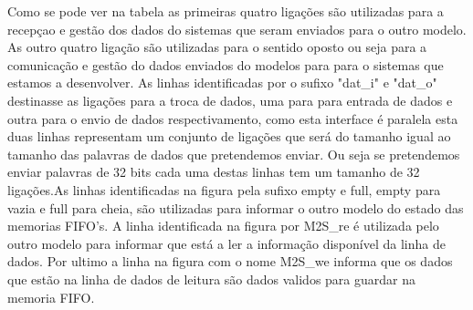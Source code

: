 Como se pode ver na tabela as primeiras quatro ligações são utilizadas para a recepçao e gestão dos dados do sistemas que seram enviados para o outro modelo. As outro quatro ligação são utilizadas para o sentido oposto ou seja para a comunicação e gestão do dados enviados do modelos para para o sistemas que estamos a desenvolver. As linhas identificadas por o sufixo "dat\_i" e "dat\_o" destinasse as ligações para a troca de dados, uma para para entrada de dados e outra para o envio de dados respectivamento, como esta interface é paralela esta duas linhas representam um conjunto de ligações que será do tamanho igual ao tamanho das palavras de dados que pretendemos enviar. Ou seja se pretendemos enviar palavras de 32 bits cada uma destas linhas tem um tamanho de 32 ligações.As linhas identificadas na figura pela sufixo empty e full, empty para vazia e full para cheia, são utilizadas para informar o outro modelo do estado das memorias FIFO's. A linha identificada na figura por M2S\_re é  utilizada pelo outro modelo para informar que está a ler a informação disponível da linha de dados. Por ultimo a linha na figura com o nome M2S\_we informa que os dados que estão na linha de dados de leitura são dados validos para guardar na memoria FIFO.



